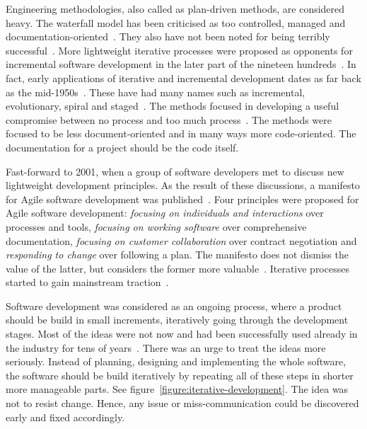 \documentclass[english]{tktltiki2}
\begin{document}
Engineering methodologies, also called as plan-driven methods, are considered heavy. The waterfall model has been criticised as too controlled, managed and documentation-oriented~\cite{Boe88, LB03, Fow05}. They also have not been noted for being terribly successful~\cite{Fow05}. More lightweight iterative processes were proposed as opponents for incremental software development in the later part of the nineteen hundreds~\cite{LB03}. In fact, early applications of iterative and incremental development dates as far back as the mid-1950s~\cite{LB03}. These have had many names such as incremental, evolutionary, spiral and staged~\cite{Fow05}. The methods focused in developing a useful compromise between no process and too much process~\cite{Fow05}. The methods were focused to be less document-oriented and in many ways more code-oriented. The documentation for a project should be the code itself.

Fast-forward to 2001, when a group of software developers met to discuss new lightweight development principles. As the result of these discussions, a manifesto for Agile software development was published~\cite{BBB01a}. Four principles were proposed for Agile software development: \emph{focusing on individuals and interactions} over processes and tools, \emph{focusing on working software} over comprehensive documentation, \emph{focusing on customer collaboration} over contract negotiation and \emph{responding to change} over following a plan. The manifesto does not dismiss the value of the latter, but considers the former more valuable~\cite{BBB01a}. Iterative processes started to gain mainstream traction~\cite{LB03, Fow05}.

Software development was considered as an ongoing process, where a product should be build in small increments, iteratively going through the development stages. Most of the ideas were not now and had been successfully used already in the industry for tens of years~\cite{Fow05}. There was an urge to treat the ideas more seriously. Instead of planning, designing and implementing the whole software, the software should be build iteratively by repeating all of these steps in shorter more manageable parts. See figure~\ref{figure:iterative-development}. The idea was not to resist change. Hence, any issue or miss-communication could be discovered early and fixed accordingly.
\end{document}
